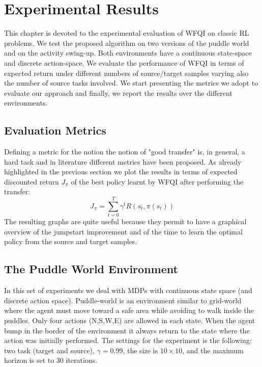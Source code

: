 \chapter{Experimental Results}
  \noindent This chapter is devoted to the experimental evaluation of WFQI on classic RL problems.
  We test the proposed algorithm on two versions of the puddle world and on the activity swing-up. Both
  environments have a continuous state-space and discrete action-space. We evaluate the performance of WFQI in terms
  of expected return under different numbers of source/target samples varying also the number of source tasks involved.\newline
  We start presenting the metrics we adopt to evaluate our approach and finally, we report the results over
  the different environments.

  \section{Evaluation Metrics}
    \noindent Defining a metric for the notion the notion of "good transfer" is, in general, a hard task and
    in literature different metrics have been proposed. As already highlighted in the previous section
    we plot the results in terms of expected discounted return $J_{\pi}$ of the best policy learnt by WFQI
    after performing the transfer:
    \begin{equation}
      J_{\pi} = \sum_{t=0}^{T} \gamma^{t}R(s_{t}, \pi(s_{t}))
    \end{equation}
    The resulting graphs are quite useful because they permit to have a graphical overview
    of the jumpstart improvement and of the time to learn the optimal policy from the source
    and target samples.\newline

  \section{The Puddle World Environment}
    \noindent In this set of experiments we deal with MDPs with continuous state space (and discrete action space).\newline
    Puddle-world is an environment similar to grid-world where the agent must move toward a safe area while avoiding
    to walk inside the puddles. Only four actions (N,S,W,E) are allowed in each state. When the agent bump in the
    border of the environment it always return to the state where the action was initially performed.\newline
    The settings for the experiment is the following: two task (target and source), $\gamma = 0.99$, the size is $10 \times 10$,
    and the maximum horizon is set to 30 iterations.\newline

